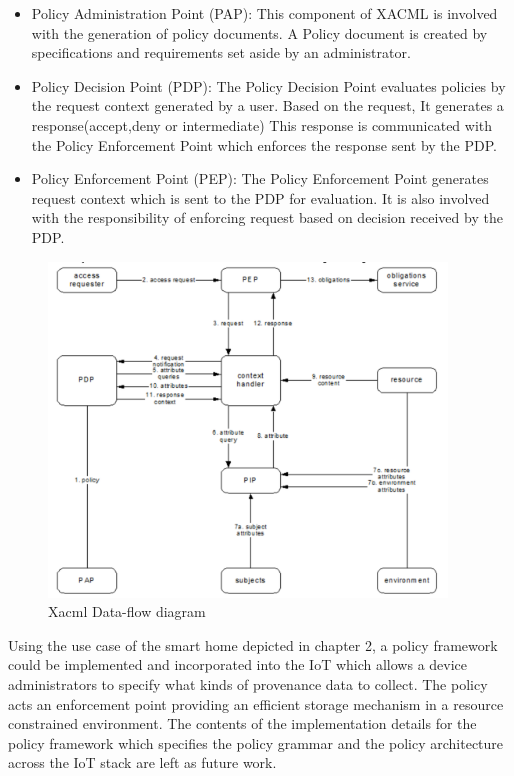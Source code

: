  
 \begin{itemize}
 
 \item Policy Administration Point (PAP): This component of XACML
is involved with the generation of policy documents. A Policy document is created by specifications and requirements set aside by an administrator.

 \item Policy Decision Point (PDP): The Policy Decision Point evaluates policies by the request context generated by a user. Based on the request, It generates a response(accept,deny or intermediate) This response is communicated with the Policy Enforcement Point which enforces the response sent by the PDP.


\item Policy Enforcement Point (PEP):  The Policy Enforcement Point generates request context which is sent to the PDP for evaluation. It is also involved with the responsibility of enforcing request based on decision received by the PDP.

 \end{itemize}
 
 
 
 \begin{figure}[h!]
\begin{center}
\includegraphics[height=3.5in]{xacml.png}
\caption{Xacml Data-flow diagram}
\end{center}
\end{figure}

\par Using the use case of the smart home depicted in chapter 2, a policy framework could be implemented and incorporated into the IoT which allows a device administrators to specify what kinds of provenance data to collect. The policy acts an enforcement point providing an efficient storage mechanism in a resource constrained environment. The contents of the implementation details for the policy framework which specifies the policy grammar and the policy architecture across the IoT stack are left as future work.


